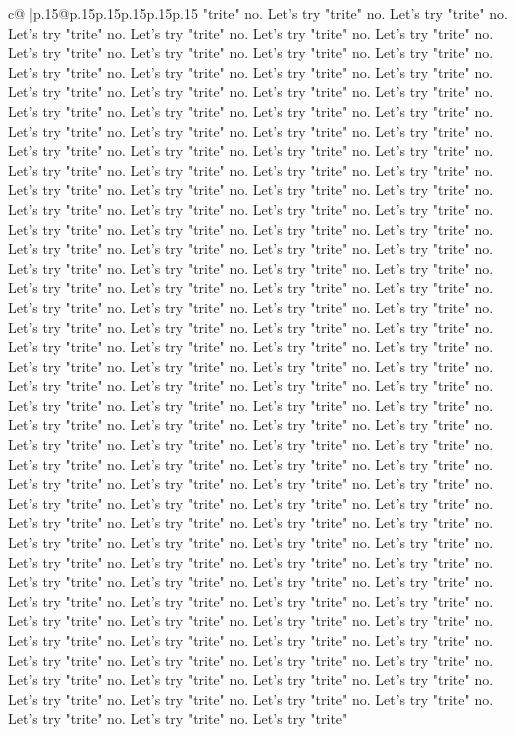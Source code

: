 \documentclass{article}
\begin{document}
{\begin{supertabular}{c@{$\;$}|p{.15\linewidth}@{}p{.15\linewidth}p{.15\linewidth}p{.15\linewidth}p{.15\linewidth}p{.15\linewidth}}
{{{"trite" no. Let's try "trite" no. Let's try "trite" no. Let's try "trite" no. Let's try "trite" no. Let's try "trite" no. Let's try "trite" no. Let's try "trite" no. Let's try "trite" no. Let's try "trite" no. Let's try "trite" no. Let's try "trite" no. Let's try "trite" no. Let's try "trite" no. Let's try "trite" no. Let's try "trite" no. Let's try "trite" no. Let's try "trite" no. Let's try "trite" no. Let's try "trite" no. Let's try "trite" no. Let's try "trite" no. Let's try "trite" no. Let's try "trite" no. Let's try "trite" no. Let's try "trite" no. Let's try "trite" no. Let's try "trite" no. Let's try "trite" no. Let's try "trite" no. Let's try "trite" no. Let's try "trite" no. Let's try "trite" no. Let's try "trite" no. Let's try "trite" no. Let's try "trite" no. Let's try "trite" no. Let's try "trite" no. Let's try "trite" no. Let's try "trite" no. Let's try "trite" no. Let's try "trite" no. Let's try "trite" no. Let's try "trite" no. Let's try "trite" no. Let's try "trite" no. Let's try "trite" no. Let's try "trite" no. Let's try "trite" no. Let's try "trite" no. Let's try "trite" no. Let's try "trite" no. Let's try "trite" no. Let's try "trite" no. Let's try "trite" no. Let's try "trite" no. Let's try "trite" no. Let's try "trite" no. Let's try "trite" no. Let's try "trite" no. Let's try "trite" no. Let's try "trite" no. Let's try "trite" no. Let's try "trite" no. Let's try "trite" no. Let's try "trite" no. Let's try "trite" no. Let's try "trite" no. Let's try "trite" no. Let's try "trite" no. Let's try "trite" no. Let's try "trite" no. Let's try "trite" no. Let's try "trite" no. Let's try "trite" no. Let's try "trite" no. Let's try "trite" no. Let's try "trite" no. Let's try "trite" no. Let's try "trite" no. Let's try "trite" no. Let's try "trite" no. Let's try "trite" no. Let's try "trite" no. Let's try "trite" no. Let's try "trite" no. Let's try "trite" no. Let's try "trite" no. Let's try "trite" no. Let's try "trite" no. Let's try "trite" no. Let's try "trite" no. Let's try "trite" no. Let's try "trite" no. Let's try "trite" no. Let's try "trite" no. Let's try "trite" no. Let's try "trite" no. Let's try "trite" no. Let's try "trite" no. Let's try "trite" no. Let's try "trite" no. Let's try "trite" no. Let's try "trite" no. Let's try "trite" no. Let's try "trite" no. Let's try "trite" no. Let's try "trite" no. Let's try "trite" no. Let's try "trite" no. Let's try "trite" no. Let's try "trite" no. Let's try "trite" no. Let's try "trite" no. Let's try "trite" no. Let's try "trite" no. Let's try "trite" no. Let's try "trite" no. Let's try "trite" no. Let's try "trite" no. Let's try "trite" no. Let's try "trite" no. Let's try "trite" no. Let's try "trite" no. Let's try "trite" no. Let's try "trite" no. Let's try "trite" no. Let's try "trite" no. Let's try "trite" no. Let's try "trite" no. Let's try "trite" no. Let's try "trite" no. Let's try "trite" no. Let's try "trite" no. Let's try "trite" no. Let's try "trite" no. Let's try "trite" no. Let's try "trite" no. Let's try "trite" no. Let's try "trite" no. Let's try "trite" no. Let's try "trite" no. Let's try "trite" no. Let's try "trite" no. Let's try "trite" no. Let's try "trite" }}}
\end{supertabular}}
\end{document}
